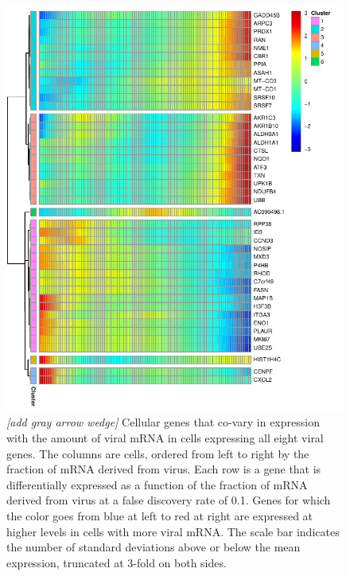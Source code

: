 \documentclass[9pt,lineno]{elife}
\newcommand{\jdbcomment}[1]{\emph{\color{red} [#1]}}
\begin{document}
\begin{figure}
\centerline{\includegraphics[width=0.7\linewidth]{figures/p_cellular_heatmap.pdf}}
\caption{\label{fig:cellulargenes}
\jdbcomment{add gray arrow wedge}
Cellular genes that co-vary in expression with the amount of viral mRNA in cells expressing all eight viral genes.
The columns are cells, ordered from left to right by the fraction of mRNA derived from virus.
Each row is a gene that is differentially expressed as a function of the fraction of mRNA derived from virus at a false discovery rate of 0.1. 
Genes for which the color goes from blue at left to red at right are expressed at higher levels in cells with more viral mRNA.
The scale bar indicates the number of standard deviations above or below the mean expression, truncated at 3-fold on both sides. 
}
\end{figure}
\end{document}
